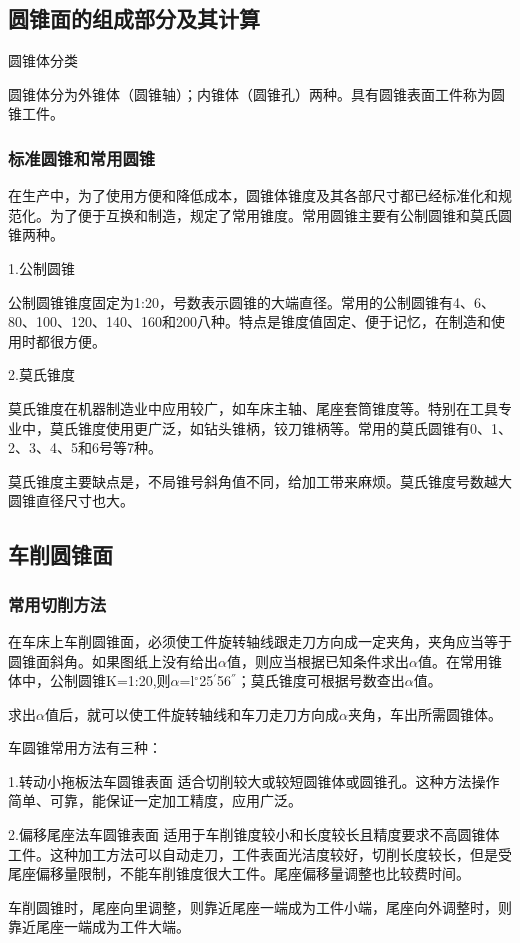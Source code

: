 \documentclass{ctexbook}
\begin{document}
\subsection{圆锥面的组成部分及其计算}
圆锥体分类

圆锥体分为外锥体（圆锥轴）；内锥体（圆锥孔）两种。具有圆锥表面工件称为圆锥工件。
\subsubsection{标准圆锥和常用圆锥}
在生产中，为了使用方便和降低成本，圆锥体锥度及其各部尺寸都已经标准化和规范化。为了便于互换和制造，规定了常用锥度。常用圆锥主要有公制圆锥和莫氏圆锥两种。

1.公制圆锥

公制圆锥锥度固定为1:20，号数表示圆锥的大端直径。常用的公制圆锥有4、6、80、100、120、140、160和200八种。特点是锥度值固定、便于记忆，在制造和使用时都很方便。

2.莫氏锥度

莫氏锥度在机器制造业中应用较广，如车床主轴、尾座套筒锥度等。特别在工具专业中，莫氏锥度使用更广泛，如钻头锥柄，铰刀锥柄等。常用的莫氏圆锥有0、1、2、3、4、5和6号等7种。

莫氏锥度主要缺点是，不局锥号斜角值不同，给加工带来麻烦。莫氏锥度号数越大圆锥直径尺寸也大。
\subsection{车削圆锥面}
\subsubsection{常用切削方法}
在车床上车削圆锥面，必须使工件旋转轴线跟走刀方向成一定夹角，夹角应当等于圆锥面斜角。如果图纸上没有给出$\alpha$值，则应当根据已知条件求出$\alpha$值。在常用锥体中，公制圆锥K=1:20,则$\alpha$=l$^{\circ}$25$^{'}$56$^{''}$；莫氏锥度可根据号数查出$\alpha$值。

求出$\alpha$值后，就可以使工件旋转轴线和车刀走刀方向成$\alpha$夹角，车出所需圆锥体。

车圆锥常用方法有三种：

1.转动小拖板法车圆锥表面 适合切削较大或较短圆锥体或圆锥孔。这种方法操作简单、可靠，能保证一定加工精度，应用广泛。

2.偏移尾座法车圆锥表面 适用于车削锥度较小和长度较长且精度要求不高圆锥体工件。这种加工方法可以自动走刀，工件表面光洁度较好，切削长度较长，但是受尾座偏移量限制，不能车削锥度很大工件。尾座偏移量调整也比较费时间。

车削圆锥时，尾座向里调整，则靠近尾座一端成为工件小端，尾座向外调整时，则靠近尾座一端成为工件大端。
\end{document}
